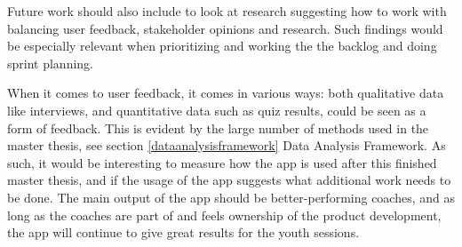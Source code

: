 Future work should also include to look at research suggesting how to work with balancing user feedback, stakeholder opinions and research. Such findings would be especially relevant when prioritizing and working the the backlog and doing sprint planning.

When it comes to user feedback, it comes in various ways: both qualitative data like interviews, and quantitative data such as quiz results, could be seen as a form of feedback. This is evident by the large number of methods used in the master thesis, see section \ref{dataanalysisframework} Data Analysis Framework. As such, it would be interesting to measure how the app is used after this finished master thesis, and if the usage of the app suggests what additional work needs to be done. The main output of the app should be better-performing coaches, and as long as the coaches are part of and feels ownership of the product development, the app will continue to give great results for the youth sessions.


